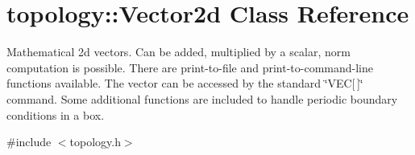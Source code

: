 \hypertarget{classtopology_1_1Vector2d}{}\section{topology\+:\+:Vector2d Class Reference}
\label{classtopology_1_1Vector2d}


Mathematical 2d vectors. Can be added, multiplied by a scalar, norm computation is possible. There are print-\/to-\/file and print-\/to-\/command-\/line functions available. The vector can be accessed by the standard \char`\"{}\+V\+E\+C\mbox{[}$\,$\mbox{]}\char`\"{} command. Some additional functions are included to handle periodic boundary conditions in a box.  




{\ttfamily \#include $<$topology.\+h$>$}

